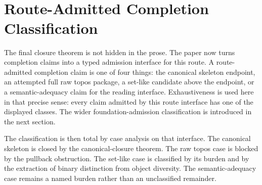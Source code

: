 \documentclass[11pt]{article}
\begin{document}
\begin{code}
\AgdaSpace{}%
\<%
\\
%
\\[\AgdaEmptyExtraSkip]%
\>[0]\<%
\\
\>[0]\AgdaSpace{}%
\AgdaSymbol{:}\AgdaSpace{}%
\<%
\\
\>[0]\AgdaSpace{}%
\AgdaSymbol{=}\AgdaSpace{}%
\<%
\\
\>[0][@{}l@{\AgdaIndent{0}}]%
\>[2]\AgdaSymbol{\{}\AgdaSpace{}%
%
\>[28]\AgdaSymbol{=}\AgdaSpace{}%
\<%
\\
%
\>[2]\AgdaSymbol{;}\AgdaSpace{}%
%
\>[28]\AgdaSymbol{=}\AgdaSpace{}%
\<%
\\
%
\>[2]\AgdaSymbol{;}\AgdaSpace{}%
%
\>[28]\AgdaSymbol{=}\AgdaSpace{}%
\<%
\\
%
\>[2]\AgdaSymbol{;}\AgdaSpace{}%
\AgdaSpace{}%
\AgdaSymbol{=}\AgdaSpace{}%
\<%
\\
%
\>[2]\AgdaSymbol{\}}\<%
\end{code}

\section{Route-Admitted Completion Classification}

The final closure theorem is not hidden in the prose.  The paper now
turns completion claims into a typed admission interface for this route.
A route-admitted completion claim is one of four things: the canonical
skeleton endpoint, an attempted full raw topos package, a set-like
candidate above the endpoint, or a semantic-adequacy claim for the
reading interface.  Exhaustiveness is used here in that precise sense:
every claim admitted by this route interface has one of the displayed
classes.  The wider foundation-admission classification is introduced in
the next section.

The classification is then total by case analysis on that interface.
The canonical skeleton is closed by the canonical-closure theorem.  The
raw topos case is blocked by the pullback obstruction.  The set-like case
is classified by its burden and by the extraction of binary distinction
from object diversity.  The semantic-adequacy case remains a named burden
rather than an unclassified remainder.
\end{document}
